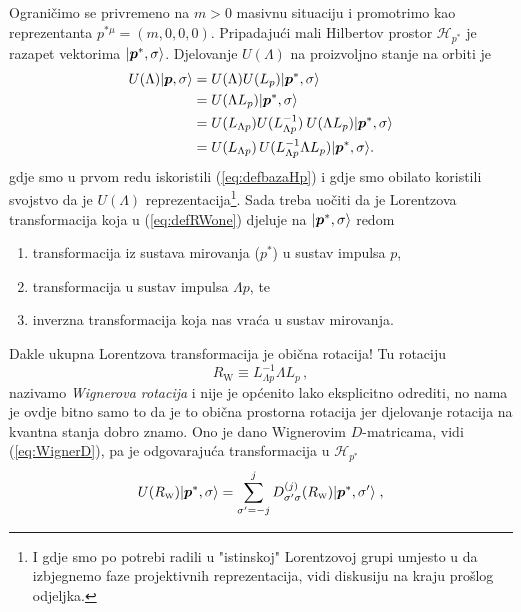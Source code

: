 Ograničimo se privremeno na $m > 0$ masivnu situaciju i promotrimo
kao reprezentanta $p^{*\mu} = (m, 0, 0, 0)$.
Pripadajući mali Hilbertov prostor $\mathcal{H}_{p^*}$ je razapet
vektorima $\ket{\vec{p}^{*}, \sigma}$. Djelovanje $U(\Lambda)$ na
proizvoljno stanje na orbiti je
\begin{align}
    U(\Lambda)\ket{\vec{p}, \sigma} &=  U(\Lambda) U(L_p) \ket{\vec{p}^{*}, \sigma} \\
     &= U(\Lambda L_p) \ket{\vec{p}^{*}, \sigma} \\
     &= U(L_{\Lambda p}) U(L_{\Lambda p}^{-1}) \: U(\Lambda L_p) \ket{\vec{p}^{*}, \sigma} \\
     &= U(L_{\Lambda p})\, U(L_{\Lambda p}^{-1} \Lambda L_p) \ket{\vec{p}^{*}, \sigma}
     \label{eq:defRWone}
.\end{align}
gdje smo u prvom redu iskoristili (\ref{eq:defbazaHp}) i gdje smo
obilato koristili svojstvo da je $U(\Lambda)$ reprezentacija\footnote{I gdje
smo po potrebi radili u "istinskoj" Lorentzovoj grupi 
umjesto u  da izbjegnemo faze projektivnih reprezentacija,
vidi diskusiju na kraju prošlog odjeljka.}.
Sada treba uočiti da je Lorentzova transformacija koja
u (\ref{eq:defRWone}) djeluje na $\ket{\vec{p}^{*}, \sigma}$ redom
\begin{enumerate}
    \item transformacija iz sustava mirovanja ($p^*$) u sustav impulsa $p$,
    \item transformacija u sustav impulsa $\Lambda p$, te
    \item inverzna transformacija koja nas vraća u sustav mirovanja.
\end{enumerate}
Dakle ukupna Lorentzova transformacija je obična rotacija!
Tu rotaciju
\begin{equation}
    R_{\scriptscriptstyle \mathrm{W}} \equiv L_{\Lambda p}^{-1} \Lambda L_p \,,
    \label{eq:defRW}
\end{equation}
nazivamo \emph{Wignerova rotacija} i nije je općenito lako eksplicitno
odrediti, no nama je ovdje bitno samo to da je to obična prostorna rotacija
jer djelovanje rotacija na kvantna stanja dobro
znamo. Ono je dano Wignerovim $D$-matricama,
vidi (\ref{eq:WignerD}), pa je odgovarajuća transformacija u $\mathcal{H}_{p^*}$
\begin{equation}
    U(R_{\scriptscriptstyle\rm W}) \ket{\vec{p}^{*}, \sigma} = 
      \sum_{\sigma'=-j}^{j} D^{(j)}_{\sigma'\sigma}(R_{\scriptscriptstyle\rm W})
      \ket{\vec{p}^{*}, \sigma'} \;,
\end{equation}
